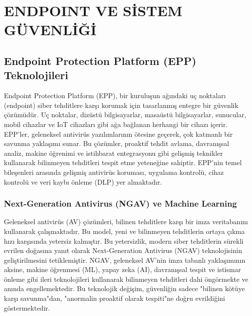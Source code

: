 \chapter{ENDPOINT VE SİSTEM GÜVENLİĞİ}

\section{Endpoint Protection Platform (EPP) Teknolojileri}

Endpoint Protection Platform (EPP), bir kuruluşun ağındaki uç noktaları (endpoint) siber tehditlere karşı korumak için tasarlanmış entegre bir güvenlik çözümüdür. Uç noktalar, dizüstü bilgisayarlar, masaüstü bilgisayarlar, sunucular, mobil cihazlar ve IoT cihazları gibi ağa bağlanan herhangi bir cihazı içerir. EPP'ler, geleneksel antivirüs yazılımlarının ötesine geçerek, çok katmanlı bir savunma yaklaşımı sunar. Bu çözümler, proaktif tehdit avlama, davranışsal analiz, makine öğrenimi ve istihbarat entegrasyonu gibi gelişmiş teknikler kullanarak bilinmeyen tehditleri tespit etme yeteneğine sahiptir. EPP'nin temel bileşenleri arasında gelişmiş antivirüs koruması, uygulama kontrolü, cihaz kontrolü ve veri kaybı önleme (DLP) yer almaktadır.

\subsection{Next-Generation Antivirus (NGAV) ve Machine Learning}

Geleneksel antivirüs (AV) çözümleri, bilinen tehditlere karşı bir imza veritabanını kullanarak çalışmaktadır. Bu model, yeni ve bilinmeyen tehditlerin ortaya çıkma hızı karşısında yetersiz kalmıştır. Bu yetersizlik, modern siber tehditlerin sürekli evrilen doğasına yanıt olarak Next-Generation Antivirus (NGAV) teknolojisinin geliştirilmesini tetiklemiştir. NGAV, geleneksel AV'nin imza tabanlı yaklaşımının aksine, makine öğrenmesi (ML), yapay zeka (AI), davranışsal tespit ve istismar önleme gibi ileri teknolojileri kullanarak bilinmeyen tehditleri dahi öngörmekte ve anında engellemektedir. Bu teknolojik değişim, güvenliğin sadece "bilinen kötüye karşı savunma"dan, "anormalin proaktif olarak tespiti"ne doğru evrildiğini göstermektedir.

